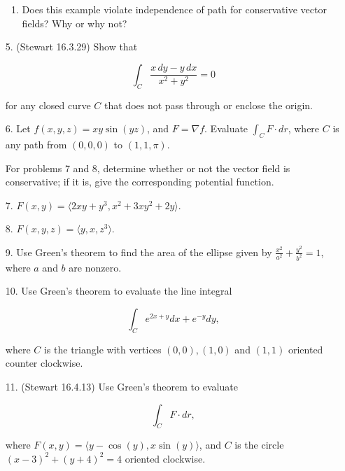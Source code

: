 \documentclass[11 pt]{report}
\begin{document}
\begin{enumerate}
\begin{enumerate}
\item Does this example violate independence of path for conservative vector fields? Why or why not?

\end{enumerate}

\item[5.] (Stewart 16.3.29) Show that 

$$\int_C \frac{x\,dy - y \,dx}{x^2+y^2} = 0$$

for any closed curve $C$ that does not pass through or enclose the origin. 

\vspace{10pt}

\item[6.] Let $f(x,y,z) = xy \sin (yz)$, and $F = \nabla f$. Evaluate $\int_C F \cdot dr$, where $C$ is any path from $(0,0,0)$ to $(1,1,\pi)$. 

\vspace{10pt} 

\item[] For problems 7 and 8, determine whether or not the vector field is conservative; if it is, give the corresponding potential function. 

\item[7.] $F(x,y) = \langle 2xy+y^3, x^2+3xy^2+2y \rangle$. 

\item[8.] $F(x,y,z) = \langle y, x, z^3 \rangle$. 

\item[9.] Use Green's theorem to find the area of the ellipse given by $\frac{x^2}{a^2} + \frac{y^2}{b^2} = 1$, where $a$ and $ b $ are nonzero. 

\item[10.] Use Green's theorem to evaluate the line integral

$$\int_C e^{2x+y} dx + e^{-y} dy,$$

where $C$ is the triangle with vertices $(0,0), (1,0)$ and $(1,1)$ oriented counter clockwise. 

\item[11.] (Stewart 16.4.13) Use Green's theorem to evaluate 

$$\int_C F \cdot dr,$$

where $F(x,y) = \langle y- \cos(y), x \sin (y) \rangle$, and $C$ is the circle $(x-3)^2 + (y+4)^2 = 4$ oriented clockwise. 





\end{enumerate}
\end{document}

